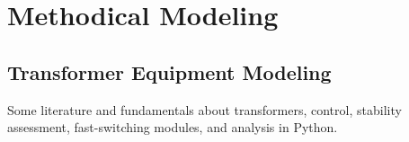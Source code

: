 


\chapter{Methodical Modeling}

\section{Transformer Equipment Modeling}


Some literature and fundamentals about transformers, control, stability assessment, fast-switching modules, and analysis in Python. %



